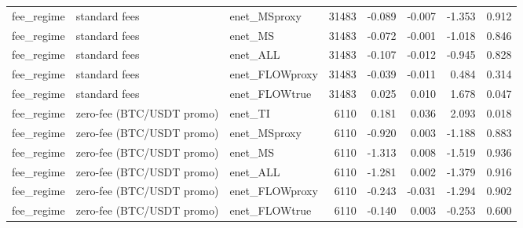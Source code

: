 \begin{tabular}{lllrrrrr}
fee_regime & standard fees & enet_MSproxy & 31483 & -0.089 & -0.007 & -1.353 & 0.912 \\
fee_regime & standard fees & enet_MS & 31483 & -0.072 & -0.001 & -1.018 & 0.846 \\
fee_regime & standard fees & enet_ALL & 31483 & -0.107 & -0.012 & -0.945 & 0.828 \\
fee_regime & standard fees & enet_FLOWproxy & 31483 & -0.039 & -0.011 & 0.484 & 0.314 \\
fee_regime & standard fees & enet_FLOWtrue & 31483 & 0.025 & 0.010 & 1.678 & 0.047 \\
fee_regime & zero-fee (BTC/USDT promo) & enet_TI & 6110 & 0.181 & 0.036 & 2.093 & 0.018 \\
fee_regime & zero-fee (BTC/USDT promo) & enet_MSproxy & 6110 & -0.920 & 0.003 & -1.188 & 0.883 \\
fee_regime & zero-fee (BTC/USDT promo) & enet_MS & 6110 & -1.313 & 0.008 & -1.519 & 0.936 \\
fee_regime & zero-fee (BTC/USDT promo) & enet_ALL & 6110 & -1.281 & 0.002 & -1.379 & 0.916 \\
fee_regime & zero-fee (BTC/USDT promo) & enet_FLOWproxy & 6110 & -0.243 & -0.031 & -1.294 & 0.902 \\
fee_regime & zero-fee (BTC/USDT promo) & enet_FLOWtrue & 6110 & -0.140 & 0.003 & -0.253 & 0.600 \\
\bottomrule
\end{tabular}
